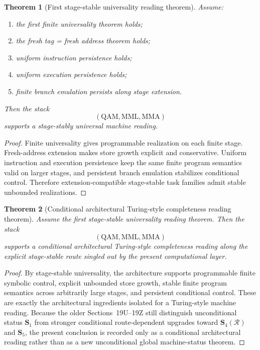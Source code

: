\documentclass[12pt,a4paper]{article}
\newtheorem{theorem}{Theorem}[section]
\begin{document}
\begin{theorem}[First stage-stable universality reading theorem]\label{thm:first-stage-stable-universality-computational-layer}
Assume:
\begin{enumerate}[leftmargin=2em]
 \item the first finite universality theorem holds;
 \item the fresh tag = fresh address theorem holds;
 \item uniform instruction persistence holds;
 \item uniform execution persistence holds;
 \item finite branch emulation persists along stage extension.
\end{enumerate}
Then the stack
\[
(\mathrm{QAM},\mathrm{MML},\mathrm{MMA})
\]
supports a stage-stably universal machine reading.
\end{theorem}

\begin{proof}
Finite universality gives programmable realization on each finite stage. Fresh-address extension makes store growth explicit and conservative. Uniform instruction and execution persistence keep the same finite program semantics valid on larger stages, and persistent branch emulation stabilizes conditional control. Therefore extension-compatible stage-stable task families admit stable unbounded realizations.
\end{proof}

\begin{theorem}[Conditional architectural Turing-style completeness reading theorem]\label{thm:architectural-turing-style-completeness-computational-layer}
Assume the first stage-stable universality reading theorem. Then the stack
\[
(\mathrm{QAM},\mathrm{MML},\mathrm{MMA})
\]
supports a conditional architectural Turing-style completeness reading along the explicit stage-stable route singled out by the present computational layer.
\end{theorem}

\begin{proof}
By stage-stable universality, the architecture supports programmable finite symbolic control, explicit unbounded store growth, stable finite program semantics across arbitrarily large stages, and persistent conditional control. These are exactly the architectural ingredients isolated for a Turing-style machine reading. Because the older Sections~19U--19Z still distinguish unconditional status \(\mathbf S_1\) from stronger conditional route-dependent upgrades toward \(\mathbf S_4(\mathcal R)\) and \(\mathbf S_5\), the present conclusion is recorded only as a conditional architectural reading rather than as a new unconditional global machine-status theorem.
\end{proof}
\end{document}
